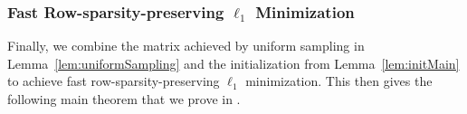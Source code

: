 \subsubsection*{Fast Row-sparsity-preserving $\ell_1$ Minimization}

Finally, we combine the matrix achieved by uniform sampling in Lemma~\ref{lem:uniformSampling} and the initialization from Lemma~\ref{lem:initMain} to achieve fast row-sparsity-preserving $\ell_1$ minimization. This then gives the following main theorem that we prove in .

\noFastMatrixMult*

